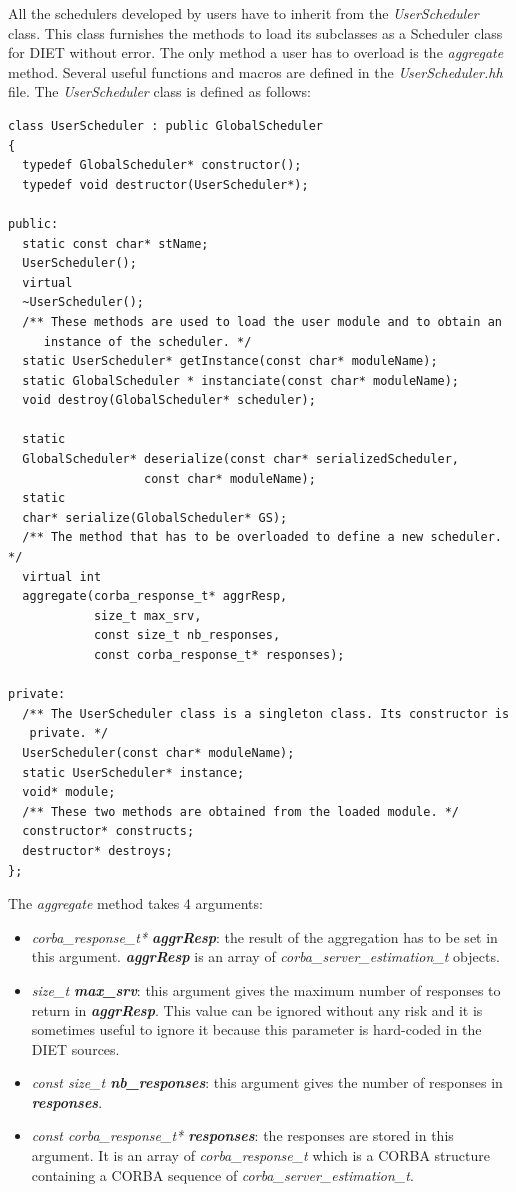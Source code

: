 All the schedulers developed by users have to inherit from the
\textit{UserScheduler} class. This class furnishes the methods to load
its subclasses as a Scheduler class for DIET without error. The only method
a user has to overload is the \textit{aggregate} method. Several useful
functions and macros are defined in the \textit{UserScheduler.hh} file.
The \textit{UserScheduler} class is defined as follows:
\begin{verbatim}
class UserScheduler : public GlobalScheduler
{
  typedef GlobalScheduler* constructor();
  typedef void destructor(UserScheduler*);

public:
  static const char* stName;
  UserScheduler();
  virtual
  ~UserScheduler();
  /** These methods are used to load the user module and to obtain an
     instance of the scheduler. */
  static UserScheduler* getInstance(const char* moduleName);
  static GlobalScheduler * instanciate(const char* moduleName);
  void destroy(GlobalScheduler* scheduler);

  static
  GlobalScheduler* deserialize(const char* serializedScheduler,
			       const char* moduleName);
  static
  char* serialize(GlobalScheduler* GS);
  /** The method that has to be overloaded to define a new scheduler. */
  virtual int
  aggregate(corba_response_t* aggrResp,
            size_t max_srv,
            const size_t nb_responses,
            const corba_response_t* responses);

private:
  /** The UserScheduler class is a singleton class. Its constructor is
   private. */
  UserScheduler(const char* moduleName);
  static UserScheduler* instance;
  void* module;
  /** These two methods are obtained from the loaded module. */
  constructor* constructs;
  destructor* destroys;
};
\end{verbatim}

\noindent The \textit{aggregate} method takes 4 arguments:
\begin{itemize}
  \item \textit{corba\_response\_t* \bf aggrResp}: the result of the aggregation
    has to be set in this argument. \textit{\bf aggrResp} is an array of
    \textit{corba\_server\_estimation\_t} objects. 
  \item \textit{size\_t \bf max\_srv}: this argument gives the maximum number
    of responses to return in \textit{\bf aggrResp}. This value can be ignored
    without any risk and it is sometimes useful to ignore it because this
    parameter is hard-coded in the DIET sources.
  \item \textit{const size\_t \bf nb\_responses}: this argument gives the number
    of responses in \textit{\bf responses}.
  \item \textit{const corba\_response\_t* \bf responses}: the responses are
    stored in this argument. It is an array of \textit{corba\_response\_t}
    which is a CORBA structure containing a CORBA sequence of
    \textit{corba\_server\_estimation\_t}.
\end{itemize}

